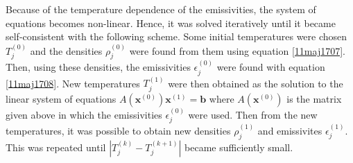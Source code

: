 \documentclass[twocolumn]{article}
\begin{document}
\begin{large}
Because of the temperature dependence of the emissivities, the system of equations becomes non-linear. Hence, it was solved iteratively until it became self-consistent with the following scheme. Some initial temperatures were chosen $T_j^{(0)}$ and the densities $\rho_j^{(0)}$ were found from them using equation \eqref{11maj1707}. Then, using these densities, the emissivities $\epsilon_j^{(0)}$ were found with equation \eqref{11maj1708}. New temperatures $T_j^{(1)}$ were then obtained as the solution to the linear system of equations $A(\mathbf{x}^{(0)})\mathbf{x}^{(1)} = \mathbf{b}$ where $A(\mathbf{x}^{(0)})$ is the matrix given above in which the emissivities $\epsilon_j^{(0)}$ were used. Then from the new temperatures, it was possible to obtain new densities $\rho_j^{(1)}$ and emissivites $\epsilon_j^{(1)}$. This was repeated until $|T_j^{(k)} -  T_{j}^{(k+1)}|$ became sufficiently small.


\end{large}
\end{document}
